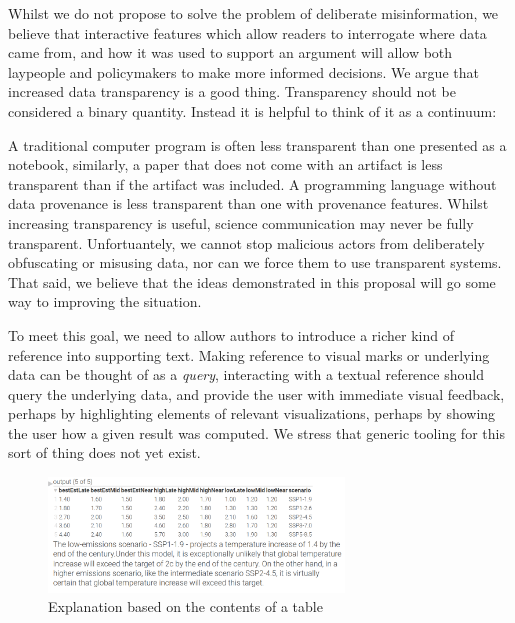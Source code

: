 Whilst we do not propose to solve the problem of deliberate misinformation, we believe
that interactive features which allow readers to interrogate where data came from, and how
it was used to support an argument will allow both laypeople and policymakers to make more
informed decisions. We argue that increased data transparency is a good thing. Transparency
should not be considered a binary quantity. Instead it is helpful to think of it as a continuum:

A traditional computer program is often less transparent than one presented as a notebook,
similarly, a paper that does not come with an artifact is less transparent than if the artifact
was included. A programming language without data provenance is less transparent than one with
provenance features. Whilst increasing transparency is useful, science communication may never
be fully transparent. Unfortuantely, we cannot stop malicious
actors from deliberately obfuscating or misusing data, nor can we force them to use transparent
systems. That said, we believe that the ideas demonstrated in this proposal will go some way
to improving the situation.

To meet this goal, we need to allow authors to introduce a richer kind of reference into supporting
text. Making reference to visual marks or underlying data can be thought of as a \emph{query},
interacting with a textual reference should query the underlying data, and provide the user with immediate
visual feedback, perhaps by highlighting elements of relevant visualizations, perhaps by showing the user
how a given result was computed. We stress that generic tooling for this sort of thing does not yet exist.

\begin{figure}[h]
   \includegraphics[width=0.7\textwidth]{fig/ipcc-table-explanation.png}
   \caption{Explanation based on the contents of a table}
   \label{fig:table-explanation}
\end{figure}